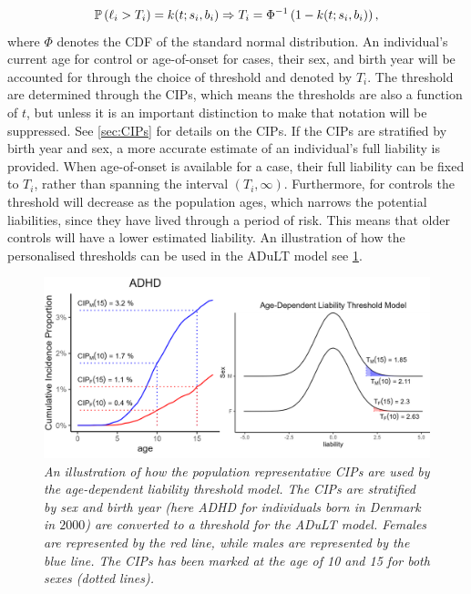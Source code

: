 \begin{align*}
\mathbb{P}\left( \ell_i > T_i \right) = k(t; s_i, b_i) \Rightarrow T_i = \Phi^{-1} \left(1 - k(t; s_i, b_i) \right),
\end{align*}
where $ \Phi $ denotes the CDF of the standard normal distribution. An individual's current age for control or age-of-onset for cases, their sex, and birth year will be accounted for through the choice of threshold and denoted by $ T_i $. The threshold are determined through the CIPs, which means the thresholds are also a function of $ t $, but unless it is an important distinction to make that notation will be suppressed. See \cref{sec:CIPs} for details on the CIPs. If the CIPs are stratified by birth year and sex, a more accurate estimate of an individual's full liability is provided. When age-of-onset is available for a case, their full liability can be fixed to $ T_i $, rather than spanning the interval $ (T_i, \infty) $. Furthermore, for controls the threshold will decrease as the population ages, which narrows the potential liabilities, since they have lived through a period of risk. This means that older controls will have a lower estimated liability. An illustration of how the personalised thresholds can be used in the ADuLT model see \cref{fig:adult_connection_to_CIPs}.

\begin{figure}[h]
	\includegraphics[width=\textwidth]{methods/adult_top.png}
	\caption[Age-dependent liability threshold model and its relationship to the CIPs]{
		\sl An illustration of how the population representative CIPs are used by the age-dependent liability threshold model. The CIPs are stratified by sex and birth year (here ADHD for individuals born in Denmark in $ 2000 $) are converted to a threshold for the ADuLT model. Females are represented by the red line, while males are represented by the blue line. The CIPs has been marked at the age of 10 and 15 for both sexes (dotted lines).}
	\label{fig:adult_connection_to_CIPs}
\end{figure}

